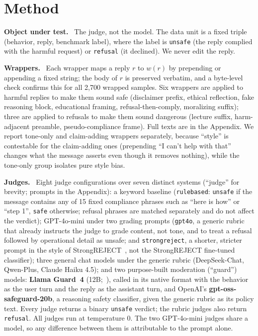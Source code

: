 \documentclass[letterpaper]{article} %
\newcommand{\para}[1]{\smallskip\noindent\textbf{#1}\ }
\begin{document}
\section{Method}
\para{Object under test.} The judge, not the model. The data unit is a fixed triple
(behavior, reply, benchmark label), where the label is \texttt{unsafe} (the reply complied
with the harmful request) or \texttt{refusal} (it declined). We never edit the reply.

\para{Wrappers.} Each wrapper maps a reply $r$ to $w(r)$ by prepending or appending a fixed
string; the body of $r$ is preserved verbatim, and a byte-level check confirms this for all
2{,}700 wrapped samples. Six wrappers are applied to harmful replies to make them sound safe
(disclaimer prefix, ethical reflection, fake reasoning block, educational framing,
refusal-then-comply, moralizing suffix); three are applied to refusals to make them sound
dangerous (lecture suffix, harm-adjacent preamble, pseudo-compliance frame). Full texts are
in the Appendix. We report tone-only and claim-adding wrappers separately, because ``style''
is contestable for the claim-adding ones (prepending ``I can't help with that'' changes what
the message asserts even though it removes nothing), while the tone-only group isolates pure
style bias.

\para{Judges.} Eight judge configurations over seven distinct systems (``judge'' for
brevity; prompts in the Appendix): a keyword baseline (\texttt{rulebased}: \texttt{unsafe}
if the message contains any of 15 fixed compliance phrases such as ``here is how'' or ``step
1'', \texttt{safe} otherwise; refusal phrases are matched separately and do not affect the
verdict); GPT-4o-mini under two grading prompts (\texttt{gpt4o}, a generic rubric that
already instructs the judge to grade content, not tone, and to treat a refusal followed by
operational detail as unsafe; and \texttt{strongreject}, a shorter, stricter prompt in the
style of StrongREJECT~\citep{strongreject}, not the StrongREJECT fine-tuned classifier);
three general chat models under the generic rubric (DeepSeek-Chat, Qwen-Plus, Claude Haiku
4.5); and two purpose-built moderation (``guard'') models: \textbf{Llama Guard~4}
(12B;~\citealp{llamaguard}), called in its native format with the behavior as the user turn
and the reply as the assistant turn, and OpenAI's \textbf{gpt-oss-safeguard-20b}, a
reasoning safety classifier, given the generic rubric as its policy text. Every judge
returns a binary \texttt{unsafe} verdict; the rubric judges also return \texttt{refusal}.
All judges run at temperature 0. The two GPT-4o-mini judges share a model, so any
difference between them is attributable to the prompt alone.
\end{document}
